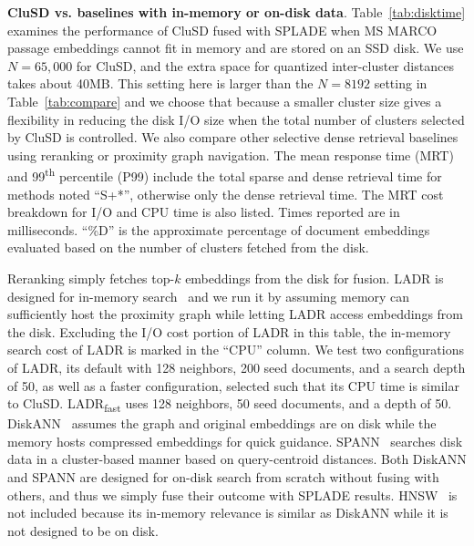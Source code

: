 
{\bf  CluSD vs. baselines with in-memory or on-disk data}.
Table~\ref{tab:disktime} examines the performance  of CluSD fused with SPLADE when MS MARCO passage 
embeddings cannot fit in memory and are stored on an SSD disk.
We use  $N=65,000$ for CluSD, and the extra space for quantized inter-cluster distances takes about 40MB. 
This setting here is larger than the $N=8192$ setting in Table~\ref{tab:compare}  and we choose that
because a smaller   cluster size gives a flexibility in  reducing the disk I/O size when 
the total number of clusters selected by CluSD is controlled.
We also compare other selective dense retrieval baselines using  reranking or proximity graph navigation.
The mean response time (MRT) and 99\textsuperscript{th} percentile (P99) include
the total sparse and dense retrieval time for methods noted ``S+*'', otherwise only the dense retrieval time.
The MRT cost breakdown for I/O and CPU time is also listed. 
Times reported are in milliseconds. 
``\%D'' is the approximate  percentage of document embeddings evaluated based on the number of clusters fetched from the disk.

Reranking simply fetches top-$k$ embeddings  from the disk for fusion. 
LADR is designed for in-memory search~\cite{2023SIGIR-LADR} and we run it by  assuming  memory can sufficiently host the proximity  graph while letting LADR access  embeddings from the disk. 
Excluding the I/O cost portion of LADR in this table, the in-memory search cost of LADR is marked in the ``CPU'' column.
We test two configurations of LADR, its default with 128 neighbors, 200 seed documents, and a search depth of 50,
as well as a faster configuration, selected such that its CPU time is similar to CluSD. 
LADR\textsubscript{fast} uses 128 neighbors, 50 seed documents, and a depth of 50.
DiskANN~\cite{NEURIPS2019_DiskANN} assumes the graph and original embeddings are on disk  while the memory  hosts
compressed embeddings for quick guidance.  SPANN~\cite{chen2021spann} searches disk data in a cluster-based manner based on query-centroid distances.
Both DiskANN and SPANN  are designed for on-disk search from scratch without fusing with others, and thus we simply fuse their outcome with SPLADE results.
HNSW~\cite{2020TPAMI-HNSW} is not included because its in-memory relevance  is similar as DiskANN while it is not designed to be on disk. 


